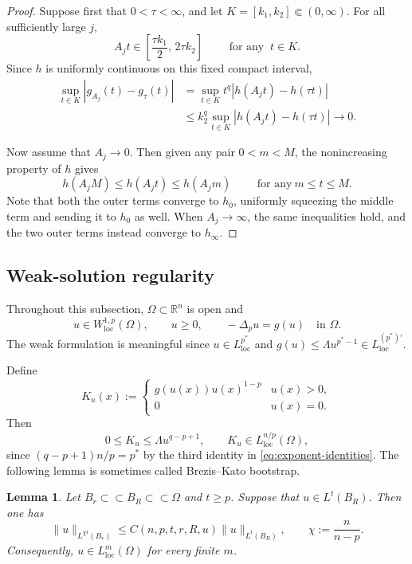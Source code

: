 \documentclass[reqno,12pt]{amsart}
\numberwithin{equation}{section}
\newtheorem{lem}[thm]{Lemma}
\theoremstyle{remark}
\newcommand{\R}{\mathbb R}
\newcommand{\loc}{\mathrm{loc}}
\begin{document}
\begin{proof}
Suppose first that $0<\tau<\infty$, and let
$K=[k_1,k_2]\Subset(0,\infty)$.
For all sufficiently large $j$,
$$
A_jt\in \left[\frac{\tau k_1}{2},\,2\tau k_2\right] \qquad \text{ for any }\ t\in K.
$$
Since $h$ is uniformly continuous on this fixed compact
interval,
\begin{align*}
 \sup_{t\in K}|g_{A_j}(t)-g_\tau(t)|
 &= \sup_{t\in K}  t^q|h(A_jt)-h(\tau t)|\\
 &\le k_2^q \sup_{t\in K}|h(A_jt)-h(\tau t)| \to 0.
\end{align*}

Now assume that $A_j\to 0$.  Then given any pair $0<m<M$, the nonincreasing property  of $h$ gives
$$
h(A_jM)\le h(A_jt)\le h(A_j m) \qquad \text{ for any} \ m\le t\le M.
$$
Note that both  the outer terms converge to $h_0$, uniformly squeezing the middle term and sending it to $h_0$ as well.
When $A_j\to\infty$, the same inequalities hold, and the two outer terms instead converge to $h_\infty$.
\end{proof}

\subsection{Weak-solution regularity}\label{sec:regularity}

Throughout this subsection, $\Omega\subset\R^n$ is open and
\begin{equation}\label{eq:weak-equation-general}
u\in W^{1,p}_{\loc}(\Omega),
\qquad  u\ge0,  \qquad
-\Delta_pu=g(u)\quad\text{in }\Omega.
\end{equation}
The weak formulation is meaningful since $u\in L^{p^*}_{\loc}$ and
$g(u)\le\Lambda u^{p^*-1}\in L^{(p^*)'}_{\loc}$.

Define
\begin{equation}\label{eq:defn-Ku}
 K_u(x):= 
 \begin{cases}
g(u(x))u(x)^{1-p} &u(x)>0,\\
0  &u(x)=0.
 \end{cases}
\end{equation}
Then
\begin{equation}\label{eq:estimate-Ku}
0\le K_u\le\Lambda u^{q-p+1},
\qquad K_u\in L^{n/p}_{\loc}(\Omega),
\end{equation}
since $(q-p+1)n/p=p^*$ by the third identity in \eqref{eq:exponent-identities}. The following lemma is sometimes called Brezis–Kato bootstrap.

\begin{lem} \label{lem:bk-step}
Let $B_r\subset\subset B_R\subset\subset\Omega$ and  $t\ge p$.  Suppose that  $u\in L^t(B_R)$. Then one has
\begin{equation}\label{eq:bk-step-estimate}
\|u\|_{L^{\chi t}(B_r)} \le C(n,p,t,r,R,u)\|u\|_{L^t(B_R)},
\qquad \chi:=\frac n{n-p}.
\end{equation}
Consequently, $u\in L^m_{\loc}(\Omega)$ for every finite $m$.
\end{lem}
\end{document}
